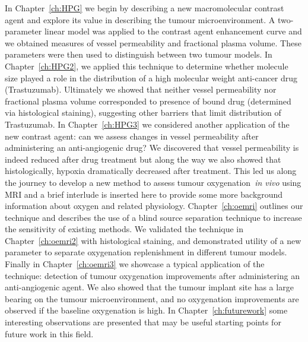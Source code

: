 In Chapter~\ref{ch:HPG} we begin by describing a new macromolecular contrast agent and explore its value in describing the tumour microenvironment.
A two-parameter linear model was applied to the contrast agent enhancement curve and we obtained measures of vessel permeability and fractional plasma volume.
These parameters were then used to distinguish between two tumour models.
In Chapter~\ref{ch:HPG2}, we applied this technique to determine whether molecule size played a role in the distribution of a high molecular weight anti-cancer drug (Trastuzumab).
Ultimately we showed that neither vessel permeability nor fractional plasma volume corresponded to presence of bound drug (determined via histological staining), suggesting other barriers that limit distribution of Trastuzumab.
In Chapter~\ref{ch:HPG3} we considered another application of the new contrast agent: can we assess changes in vessel permeability after administering an anti-angiogenic drug?
We discovered that vessel permeability is indeed reduced after drug treatment but along the way we also showed that histologically, hypoxia dramatically decreased after treatment. 
This led us along the journey to develop a new method to assess tumour oxygenation~\emph{in vivo} using MRI and a brief interlude is inserted here to provide some more background information about oxygen and related physiology.
Chapter~\ref{ch:oemri} outlines our technique and describes the use of a blind source separation technique to increase the sensitivity of existing methods. 
We validated the technique in Chapter~\ref{ch:oemri2} with histological staining, and demonstrated utility of a new parameter to separate oxygenation replenishment in different tumour models.
Finally in Chapter~\ref{ch:oemri3} we showcase a typical application of the technique: detection of tumour oxygenation improvements after administering an anti-angiogenic agent. 
We also showed that the tumour implant site has a large bearing on the tumour microenvironment, and no oxygenation improvements are observed if the baseline oxygenation is high.
In Chapter~\ref{ch:futurework} some interesting observations are presented that may be useful starting points for future work in this field.
